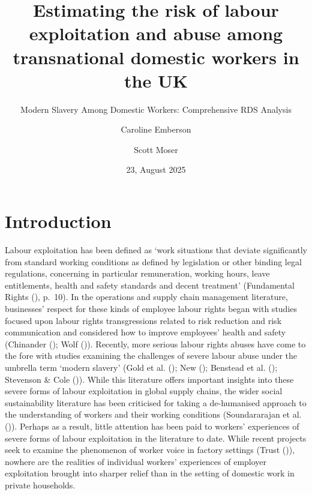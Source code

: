 \documentclass[
  12pt,
]{article}
\title{Estimating the risk of labour exploitation and abuse among
transnational domestic workers in the UK}
\subtitle{Modern Slavery Among Domestic Workers: Comprehensive RDS
Analysis}
\author{Caroline Emberson \and Scott Moser}
\date{23, August 2025}
\theoremstyle{plain}
\theoremstyle{definition}
\renewcommand*\contentsname{Table of contents}
\newcommand\contentsname{Table of contents}
\begin{document}
\maketitle

\renewcommand*\contentsname{Table of contents}
{
\hypersetup{linkcolor=}
\setcounter{tocdepth}{3}
\tableofcontents
}

\newpage

\section{Introduction}\label{introduction}

Labour exploitation has been defined as `work situations that deviate
significantly from standard working conditions as defined by legislation
or other binding legal regulations, concerning in particular
remuneration, working hours, leave entitlements, health and safety
standards and decent treatment' (Fundamental Rights
(),
p.~10). In the operations and supply chain management literature,
businesses' respect for these kinds of employee labour rights began with
studies focused upon labour rights transgressions related to risk
reduction and risk communication and considered how to improve
employees' health and safety (Chinander
(); Wolf
()). Recently, more
serious labour rights abuses have come to the fore with studies
examining the challenges of severe labour abuse under the umbrella term
`modern slavery' (Gold et al. ();
New (); Benstead et al.
(); Stevenson \& Cole
()). While this literature
offers important insights into these severe forms of labour exploitation
in global supply chains, the wider social sustainability literature has
been criticised for taking a de-humanised approach to the understanding
of workers and their working conditions (Soundararajan et al.
()). Perhaps as a
result, little attention has been paid to workers' experiences of severe
forms of labour exploitation in the literature to date. While recent
projects seek to examine the phenomenon of worker voice in factory
settings (Trust ()),
nowhere are the realities of individual workers' experiences of employer
exploitation brought into sharper relief than in the setting of domestic
work in private households.
\end{document}
